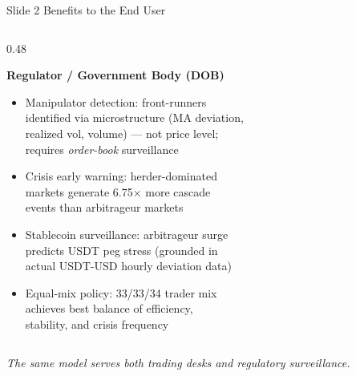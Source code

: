 \documentclass[aspectratio=169, 10pt]{beamer}
\newcommand{\blu}[1]{{\color{accentblue}#1}}
\newcommand{\grn}[1]{{\color{accentgreen}#1}}
\begin{document}
\begin{frame}[t]{Slide 2 \quad Benefits to the End User}
\begin{columns}[T]
  \begin{column}{0.48\textwidth}
    \begin{block}{\small\textbf{Regulator / Government Body (DOB)}}
    \vspace{2pt}
    \begin{itemize}\setlength\itemsep{3pt}\small
      \item \grn{Manipulator detection:} front-runners\\
            identified via microstructure (MA deviation,\\
            realized vol, volume) --- not price level;\\
            requires \textit{order-book} surveillance
      \item \grn{Crisis early warning:} herder-dominated\\
            markets generate \blu{6.75$\times$} more cascade\\
            events than arbitrageur markets
      \item \grn{Stablecoin surveillance:} arbitrageur surge\\
            predicts USDT peg stress (grounded in\\
            actual USDT-USD hourly deviation data)
      \item \grn{Equal-mix policy:} 33/33/34 trader mix\\
            achieves best balance of efficiency,\\
            stability, and crisis frequency
    \end{itemize}
    \vspace{2pt}
    \end{block}
  \end{column}

\end{columns}
\vspace{4pt}
\centering\small\textit{The same model serves both trading desks and regulatory surveillance.}
\end{frame}
\end{document}
